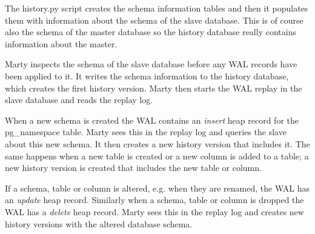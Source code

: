 The history.py script creates the schema information tables and then it populates them with information about the schema of the slave database.
This is of course also the schema of the master database so the history database really contains information about the master.

Marty inspects the schema of the slave database before any WAL records have been applied to it.
It writes the schema information to the history database, which creates the first history version.
Marty then starts the WAL replay in the slave database and reads the replay log.

When a new schema is created the WAL contains an \textit{insert} heap record for the pg\_namespace table.
Marty sees this in the replay log and queries the slave about this new schema.
It then creates a new history version that includes it.
The same happens when a new table is created or a new column is added to a table; a new history version is created that includes the new table or column.

If a schema, table or column is altered, e.g. when they are renamed, the WAL has an \textit{update} heap record.
Similarly when a schema, table or column is dropped the WAL has a \textit{delete} heap record.
Marty sees this in the replay log and creates new history versions with the altered database schema.